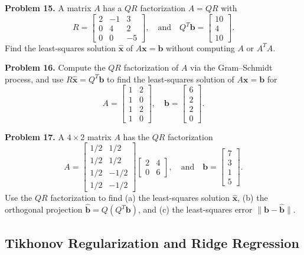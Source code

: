\documentclass[11pt, letterpaper]{article}
\theoremstyle{definition}
\theoremstyle{remark}
\begin{document}
\textbf{Problem 15.} A matrix $A$ has a $QR$ factorization $A = QR$ with
\[
R = \begin{bmatrix} 2 & -1 & 3 \\ 0 & 4 & 2 \\ 0 & 0 & -5 \end{bmatrix}, \quad \text{and} \quad Q^T \mathbf{b} = \begin{bmatrix} 10 \\ 4 \\ 10 \end{bmatrix}.
\]
Find the least-squares solution $\hat{\mathbf{x}}$ of $A\mathbf{x} = \mathbf{b}$ without computing $A$ or $A^T A$.

\textbf{Problem 16.} Compute the $QR$ factorization of $A$ via the Gram--Schmidt process, and use $R\hat{\mathbf{x}} = Q^T \mathbf{b}$ to find the least-squares solution of $A\mathbf{x} = \mathbf{b}$ for
\[
A = \begin{bmatrix} 1 & 2 \\ 1 & 0 \\ 1 & 2 \\ 1 & 0 \end{bmatrix}, \quad \mathbf{b} = \begin{bmatrix} 6 \\ 2 \\ 2 \\ 0 \end{bmatrix}.
\]

\textbf{Problem 17.} A $4 \times 2$ matrix $A$ has the $QR$ factorization
\[
A = \begin{bmatrix} 1/2 & 1/2 \\ 1/2 & 1/2 \\ 1/2 & -1/2 \\ 1/2 & -1/2 \end{bmatrix} \begin{bmatrix} 2 & 4 \\ 0 & 6 \end{bmatrix}, \quad \text{and} \quad \mathbf{b} = \begin{bmatrix} 7 \\ 3 \\ 1 \\ 5 \end{bmatrix}.
\]
Use the $QR$ factorization to find (a) the least-squares solution $\hat{\mathbf{x}}$, (b) the orthogonal projection $\hat{\mathbf{b}} = Q(Q^T \mathbf{b})$, and (c) the least-squares error $\|\mathbf{b} - \hat{\mathbf{b}}\|$.

\subsection{Tikhonov Regularization and Ridge Regression}
\end{document}
